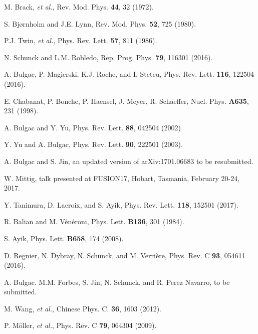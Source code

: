 \documentclass{webofc}
\begin{document}
\begin{thebibliography}{99}
 M. Brack, {\it et al.},   Rev. Mod. Phys. {\bf 44}, 32 (1972).

 S. Bj{\o}rnholm and J.E. Lynn,   Rev. Mod. Phys. {\bf 52}, 725 (1980).

 P.J. Twin, {\it et al.},  Phys. Rev. Lett. {\bf 57}, 811 (1986).

 N. Schunck and L.M. Robledo,  Rep. Prog. Phys. {\bf 79}, 116301 (2016).

 A. Bulgac, P. Magierski, K.J. Roche, and I. Stetcu,  Phys. Rev. Lett. {\bf 116}, 122504 (2016).

 E. Chabanat, P. Bonche, P. Haensel, J. Meyer, R. Schaeffer,  Nucl. Phys. {\bf A635}, 231 (1998).

 A. Bulgac and Y. Yu,  Phys. Rev. Lett. {\bf 88}, 042504 (2002)

 Y. Yu and A. Bulgac,  Phys. Rev. Lett. {\bf 90}, 222501 (2003).

 A. Bulgac and S. Jin, an updated version of  arXiv:1701.06683 to be resubmitted.

 W. Mittig, talk presented at FUSION17, Hobart, Tasmania, February 20-24, 2017.

 Y. Tanimura, D. Lacroix, and S. Ayik, Phys. Rev. Lett. {\bf 118}, 152501 (2017).

 R. Balian and M. V\'{e}n\'{e}roni, Phys. Lett. {\bf B136}, 301 (1984).

 S. Ayik, Phys. Lett. {\bf B658}, 174 (2008).

 D. Regnier, N. Dybray, N. Schunck, and M. Verri\`{e}re, Phys. Rev. C {\bf 93}, 054611 (2016).

 A. Bulgac. M.M. Forbes, S. Jin, N. Schunck, and R. Perez Navarro,  to be submitted.

  M. Wang, {\it et al.}, Chinese Phys. C. {\bf 36}, 1603 (2012).

 P. M\"{o}ller, {\it et al.}, Phys. Rev. C {\bf 79}, 064304 (2009).

\end{thebibliography}
\end{document}
